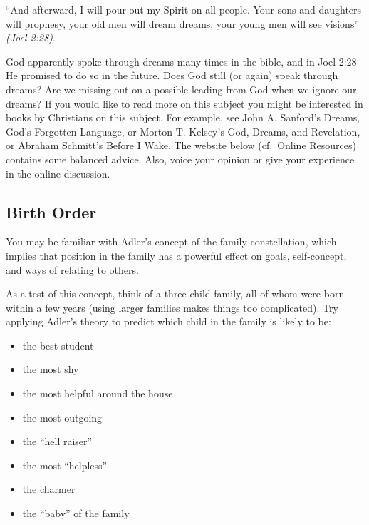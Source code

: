 \documentclass[
]{book}
\providecommand{\tightlist}{%
  \setlength{\itemsep}{0pt}\setlength{\parskip}{0pt}}
\begin{document}
``And afterward, I will pour out my Spirit on all people. Your sons and daughters will prophesy, your old men will dream dreams, your young men will see visions'' \emph{(Joel 2:28)}.

God apparently spoke through dreams many times in the bible, and in Joel 2:28 He promised to do so in the future. Does God still (or again) speak through dreams? Are we missing out on a possible leading from God when we ignore our dreams? If you would like to read more on this subject you might be interested in books by Christians on this subject. For example, see John A. Sanford's Dreams, God's Forgotten Language, or Morton T. Kelsey's God, Dreams, and Revelation, or Abraham Schmitt's Before I Wake. The website below (cf.~Online Resources) contains some balanced advice. Also, voice your opinion or give your experience in the online discussion.

\hypertarget{birth-order}{%
\subsection*{Birth Order}\label{birth-order}}

You may be familiar with Adler's concept of the family constellation, which implies that position in the family has a powerful effect on goals, self-concept, and ways of relating to others.

As a test of this concept, think of a three-child family, all of whom were born within a few years (using larger families makes things too complicated). Try applying Adler's theory to predict which child in the family is likely to be:

\begin{itemize}
\tightlist
\item
  the best student\\
\item
  the most shy\\
\item
  the most helpful around the house\\
\item
  the most outgoing\\
\item
  the ``hell raiser''\\
\item
  the most ``helpless''\\
\item
  the charmer\\
\item
  the ``baby'' of the family
\end{itemize}
\end{document}
